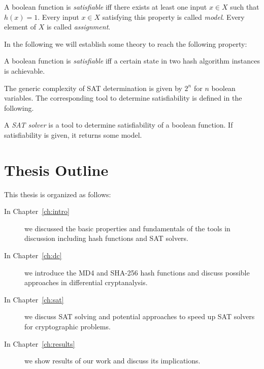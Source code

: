 \begin{defi}
  A boolean function is \emph{satisfiable} iff there exists at least one
  input $x \in X$ such that $h(x) = 1$.
  Every input $x \in X$ satisfying this property is called \emph{model}.
  Every element of $X$ is called \emph{assignment}.
\end{defi}

In the following we will establish some theory to reach
the following property:

\begin{defi}
  A boolean function is \emph{satisfiable} iff a certain state in two hash
  algorithm instances is achievable.
\end{defi}

The generic complexity of SAT determination is given by $2^n$ for $n$ boolean variables.
The corresponding tool to determine satisfiability is defined in the following.

\begin{defi}
  A \emph{SAT solver} is a tool to determine satisfiability of a boolean function.
  If satisfiability is given, it returns some model.
\end{defi}

\section{Thesis Outline}
\label{sec:intro-outline}
%
This thesis is organized as follows:

\begin{description}
\item[In Chapter~\ref{ch:intro}] we discussed the basic properties and fundamentals
of the tools in discussion including hash functions and SAT solvers.

\item[In Chapter~\ref{ch:dc}] we introduce the MD4 and SHA-256 hash functions and
discuss possible approaches in differential cryptanalysis.

\item[In Chapter~\ref{ch:sat}] we discuss SAT solving and potential
approaches to speed up SAT solvers for cryptographic problems.

\item[In Chapter~\ref{ch:results}] we show results of our work
and discuss its implications.
\end{description}
